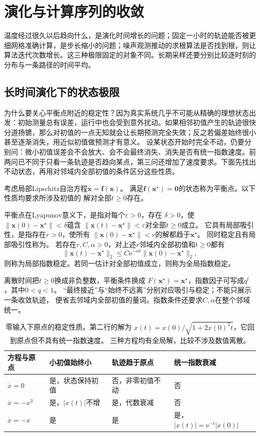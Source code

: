 \section{演化与计算序列的收敛}
\label{sec:action-state-convergence}
温度经过很久以后趋向什么，是演化时间增长的问题；固定一小时的轨迹能否被更细网格准确计算，是步长缩小的问题；噪声观测推动的求根算法是否找到根，则让算法迭代次数增长。这三种极限固定的对象不同。长期采样还要分别比较逐时刻的分布与一条路径的时间平均。

\subsection{长时间演化下的状态极限}
为什么要关心平衡点附近的稳定性？因为真实系统几乎不可能从精确的理想状态出发：初始测量总有误差，运行中也会受到意外扰动。如果相邻初值产生的轨迹很快分道扬镳，那么对初值的一点无知就会让长期预测完全失效；反之若偏差始终很小甚至逐渐消失，用近似初值做预测才有意义。
设某状态开始时完全不动，仍要分别问：微小初值误差会不会放大、会不会最终消失、消失是否有统一指数速度。前两问已不同于只看一条轨迹是否趋向某点，第三问还增加了速度要求。下面先找出不动状态，再用对邻域内全部初值的条件区分这些性质。
\begin{definition}[平衡点与稳定性]
  \label{def:dynamical-equilibrium-stability}
  考虑局部Lipschitz自治方程$\dot{\bm x}=\bm f(\bm x)$。
  满足$\bm f(\bm x^\star)=\bm0$的状态称为平衡点。以下性质均要求所涉及初值的
  解对全部$t\geq0$存在。

  平衡点在Lyapunov意义下，是指对每个$\varepsilon>0$，存在
  $\delta>0$，使$\|\bm x(0)-\bm x^\star\|<\delta$蕴含
  $\|\bm x(t)-\bm x^\star\|<\varepsilon$对全部$t\geq0$成立。
  它具有局部吸引性，是指存在$r>0$，使所有
  $\|\bm x(0)-\bm x^\star\|<r$的解都趋于$\bm x^\star$。
  同时稳定且有局部吸引性称为。
  若存在$r,C,\alpha>0$，对上述$r$邻域内全部初值和$t\geq0$都有
  \[
    \|\bm x(t)-\bm x^\star\|_2
    \leq C\mathrm e^{-\alpha t}\|\bm x(0)-\bm x^\star\|_2,
  \]
  则称为局部指数稳定。若同一估计对全部初值成立，则称为全局指数稳定。
\end{definition}
离散时间把$t\geq0$换成非负整数，平衡条件换成
$F(\bm x^\star)=\bm x^\star$，指数因子可写成$q^t$，其中$0<q<1$。
“最终接近”与“始终不远离”分别对应吸引与稳定；不能只展示一条收敛轨迹，
便省去邻域内全部初值的量词。指数条件还要求$C,\alpha$在整个邻域统一。

\begin{table}[htbp]
  \centering
  \begin{tabularx}{\linewidth}{lXXX}
    \toprule
    方程与原点 & 小初值始终小 & 轨迹趋于原点 & 统一指数衰减\\
    \midrule
    $\dot x=0$ & 是，状态保持初值 & 否，非零初值不动 & 否\\
    $\dot x=-x^3$ & 是，$|x(t)|$不增 & 是，代数衰减 & 否\\
    $\dot x=-x$ & 是 & 是 & 是，$|x(t)|=\mathrm e^{-t}|x(0)|$\\
    \bottomrule
  \end{tabularx}
  \caption{零输入下原点的稳定性质。第二行的解为
  $x(t)=x(0)/\sqrt{1+2x(0)^2t}$，它回到原点但不具有统一指数速度。
  三种方程均有全局解，比较不涉及数值离散。}
  \label{tab:dynamical-stability-types}
\end{table}

